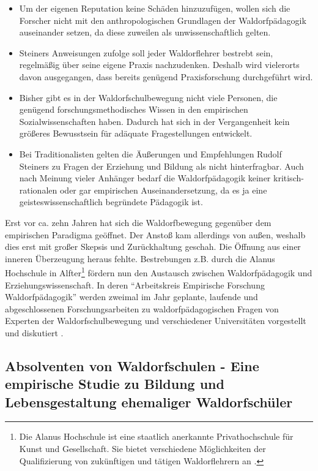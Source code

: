 	\begin{itemize}
    	\item Um der eigenen Reputation keine Schäden hinzuzufügen, wollen sich die Forscher nicht mit den anthropologischen Grundlagen der Waldorfpädagogik auseinander setzen, da diese zuweilen als unwissenschaftlich gelten.

    	\item Steiners Anweisungen zufolge soll jeder Waldorflehrer bestrebt sein, regelmäßig über seine eigene Praxis nachzudenken. Deshalb wird vielerorts davon ausgegangen, dass bereits genügend Praxisforschung durchgeführt wird.

    	\item Bisher gibt es in der Waldorfschulbewegung nicht viele Personen, die genügend forschungsmethodisches Wissen in den empirischen Sozialwissenschaften haben. Dadurch hat sich in der Vergangenheit kein größeres Bewusstsein für adäquate Fragestellungen entwickelt. 

    	\item Bei Traditionalisten gelten die Äußerungen und Empfehlungen Rudolf Steiners zu Fragen der Erziehung und Bildung als nicht hinterfragbar. Auch nach Meinung vieler Anhänger bedarf die Waldorfpädagogik keiner kritisch-rationalen oder gar empirischen Auseinandersetzung, da es ja eine geisteswissenschaftlich begründete Pädagogik ist.
    \end{itemize}

Erst vor ca. zehn Jahren hat sich die Waldorfbewegung gegenüber dem empirischen Paradigma geöffnet. Der Anstoß kam allerdings von außen, weshalb dies erst mit großer Skepsis und Zurückhaltung geschah. Die Öffnung aus einer inneren Überzeugung heraus fehlte. Bestrebungen z.B. durch die Alanus Hochschule in Alfter\footnote{Die Alanus Hochschule ist eine staatlich anerkannte Privathochschule für Kunst und Gesellschaft. Sie bietet verschiedene Möglichkeiten der Qualifizierung von zukünftigen und tätigen Waldorflehrern an \citep[vgl.][]{alanus13}.} fördern nun den Austausch zwischen Waldorfpädagogik und Erziehungswissenschaft. In deren \enquote{Arbeitskreis Empirische Forschung Waldorfpädagogik} werden zweimal im Jahr geplante, laufende und abgeschlossenen Forschungsarbeiten zu waldorfpädagogischen Fragen von Experten der Waldorfschulbewegung und verschiedener Universitäten vorgestellt und diskutiert \citep[vgl.][S. 128]{paschen10}.

\subsection{Absolventen von Waldorfschulen - Eine empirische Studie zu Bildung und Lebensgestaltung ehemaliger Waldorfschüler} %
\label{Studie}

